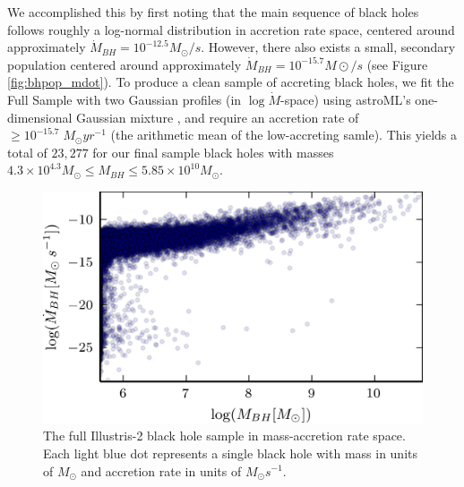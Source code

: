We accomplished this by first noting that the main sequence of black
holes follows roughly a log-normal distribution in accretion rate
space, centered around approximately $\dot{M}_{BH}=10^{-12.5}M_{\odot}/s$.
However, there also exists a small, secondary population centered
around approximately $\dot{M}_{BH}=10^{-15.7}M\odot/s$ (see Figure
\ref{fig:bhpop_mdot}). To produce a clean sample of accreting black
holes, we fit the Full Sample with two Gaussian profiles (in $\log\dot{M}$-space)
using astroML's one-dimensional Gaussian mixture \citep{vanderplas2012introduction},
and require an accretion rate of $\ge10^{-15.7}\; M_{\odot}yr^{-1}$
(the arithmetic mean of the low-accreting samle). This yields a total
of $23,277$ for our final sample black holes with masses $4.3\times10^{4.3}M_{\odot}\le M_{BH}\le5.85\times10^{10}M_{\odot}$.
\begin{figure}
\centering{}\includegraphics[clip]{Figures/Illustris2_bhpop_full}
\protect\caption{\label{fig:bhpop_full}The full Illustris-2 black hole sample in mass-accretion
rate space. Each light blue dot represents a single black hole with
mass in units of $M_{\odot}$ and accretion rate in units of $M_{\odot}s^{-1}$.}
\end{figure}
